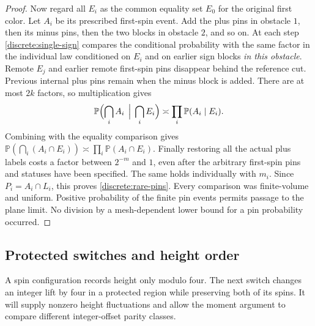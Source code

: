 \documentclass[11pt]{article}
\newcommand{\Prob}{\mathbb P}
\theoremstyle{definition}
\theoremstyle{remark}
\numberwithin{equation}{section}
\begin{document}
\begin{proof}
Now regard all $E_i$ as the common equality set $E_0$ for the original
first color. Let $A_i$ be its prescribed first-spin event. Add the plus
pins in obstacle $1$, then its minus pins, then the two blocks in obstacle
$2$, and so on. At each step \eqref{discrete:single-sign} compares the
conditional probability with the same factor in the individual law
conditioned on $E_i$ and on earlier sign blocks \emph{in this obstacle}.
Remote $E_j$ and earlier remote first-spin pins disappear behind the
reference cut. Previous internal plus pins remain when the minus block
is added. There are at most $2k$ factors, so multiplication gives
\[
 \Prob\Bigl(\bigcap_i A_i\,\Bigm|\,\bigcap_i E_i\Bigr)
       \asymp\prod_i\Prob(A_i\mid E_i).
\]
Combining with the equality comparison gives
$\Prob(\bigcap_i(A_i\cap E_i))\asymp
\prod_i\Prob(A_i\cap E_i)$. Finally restoring all the actual plus
labels costs a factor between $2^{-m}$ and $1$, even after the arbitrary
first-spin pins and statuses have been specified. The same holds
individually with $m_i$. Since $P_i=A_i\cap L_i$, this proves
\eqref{discrete:rare-pins}. Every comparison was finite-volume and
uniform. Positive probability of the finite pin events permits passage
to the plane limit. No division by a mesh-dependent lower bound for a
pin probability occurred.
\end{proof}

\subsection{Protected switches and height order}

A spin configuration records height only modulo four.  The next switch
changes an integer lift by four in a protected region while preserving
both of its spins.  It will supply nonzero height fluctuations and allow
the moment argument to compare different integer-offset parity classes.
\end{document}
